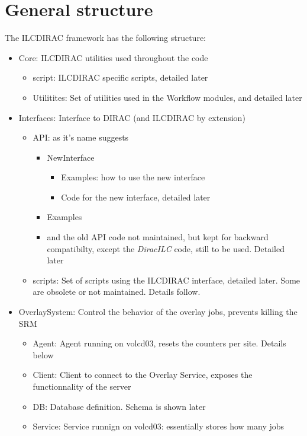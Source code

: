 \documentclass[a4paper,12pt]{article}
\begin{document}
\section{General structure}
The ILCDIRAC framework has the following structure:
\begin{itemize}
  \item Core: ILCDIRAC utilities used throughout the code
  \begin{itemize}
    \item script: ILCDIRAC specific scripts, detailed later
    \item Utilitites: Set of utilities used in the Workflow modules, and
    detailed later
  \end{itemize}
  \item Interfaces: Interface to DIRAC (and ILCDIRAC by extension)
  \begin{itemize}
    \item API: as it's name suggests
    \begin{itemize}
      \item NewInterface
      \begin{itemize}
        \item Examples: how to use the new interface
        \item Code for the new interface, detailed later
      \end{itemize}
      \item Examples
      \item and the old API code not maintained, but kept for backward
      compatibilty, except the \emph{DiracILC} code, still to be used. Detailed
      later
    \end{itemize}
    \item scripts: Set of scripts using the ILCDIRAC interface, detailed later.
    Some are obsolete or not maintained. Details follow.
  \end{itemize}
  \item OverlaySystem: Control the behavior of the overlay jobs, prevents
  killing the SRM
  \begin{itemize}
    \item Agent: Agent running on volcd03, resets the counters per site. Details
    below
    \item Client: Client to connect to the Overlay Service, exposes the
    functionnality of the server
    \item DB: Database definition. Schema is shown later
    \item Service: Service runnign on volcd03: essentially stores how many jobs

\end{itemize}
\end{itemize}
\end{document}
